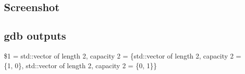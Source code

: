 \documentclass{article}
\theoremstyle{definition}
\begin{document}
\subsection{Screenshot}
\begin{figure}[H]
\end{figure}

\subsection{gdb outputs}
\$1 = std::vector of length 2, capacity 2 = \{std::vector of length 2, capacity 2 = \{1, 0\},
  std::vector of length 2, capacity 2 = \{0, 1\}\}
\end{document}
